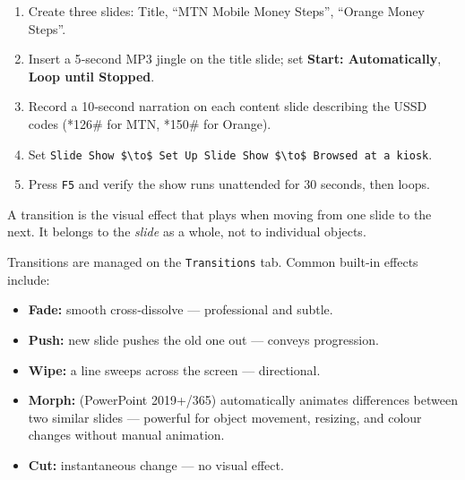 \documentclass[11pt]{article}
\newcommand{\cle}[1]{{\popxbold\color{popdark}#1}}
\newcounter{popsec}
\newcounter{popsub}
\newcommand{\courssub}[1]{%
  \stepcounter{popsub}%
  \par\vspace{9pt}\noindent{\popxbold\fontsize{11.5}{13}\selectfont\color{popink}{\color{poporange}\thepopsec.\thepopsub}\hspace{6pt}#1}\par\nopagebreak\vspace{4pt}
}
\begin{document}
\begin{experience}
\begin{enumerate}
\item Create three slides: Title, “MTN Mobile Money Steps”, “Orange Money Steps”.
\item Insert a 5‑second MP3 jingle on the title slide; set \textbf{Start: Automatically}, \textbf{Loop until Stopped}.
\item Record a 10‑second narration on each content slide describing the USSD codes (*126\# for MTN, *150\# for Orange).
\item Set \texttt{Slide Show \$\textbackslash{}to\$ Set Up Slide Show \$\textbackslash{}to\$ Browsed at a kiosk}.
\item Press \texttt{F5} and verify the show runs unattended for 30 seconds, then loops.
\end{enumerate}
\end{experience}

\courssub{Slide Transitions}

\begin{definition}[Transition]
A \cle{transition} is the visual effect that plays when moving from one slide to the next. It belongs to the \emph{slide} as a whole, not to individual objects.
\end{definition}

Transitions are managed on the \texttt{Transitions} tab. Common built‑in effects include:
\begin{itemize}
\item \textbf{Fade:} smooth cross‑dissolve — professional and subtle.
\item \textbf{Push:} new slide pushes the old one out — conveys progression.
\item \textbf{Wipe:} a line sweeps across the screen — directional.
\item \textbf{Morph:} (PowerPoint 2019+/365) automatically animates differences between two similar slides — powerful for object movement, resizing, and colour changes without manual animation.
\item \textbf{Cut:} instantaneous change — no visual effect.
\end{itemize}
\end{document}
